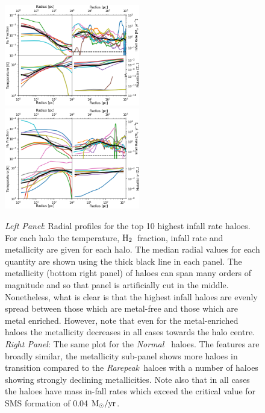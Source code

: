 \documentclass[graphics, twocolumn, usenatbib]{mn2e}
\newcommand{\msolaryrc} {$\rm{M_{\odot}/yr}$}
\newcommand{\molH} {$\rm{H_2}$~}
\newcommand{\rarepeak} {\textit{Rarepeak~}}
\newcommand{\normal} {\textit{Normal~}}
\begin{document}
\begin{figure}
\centering
\begin{minipage}{175mm}      \begin{center} 
\centerline{
\includegraphics[width=0.525\textwidth]{FIGURES/MultiPlot_Rarepeak.png}
\includegraphics[width=0.525\textwidth]{FIGURES/MultiPlot_Normal.png}}
\caption{\textit{Left Panel}: Radial profiles for the top 10 highest infall rate haloes. For
  each halo the temperature, \molH fraction, infall rate and metallicity are given for
  each halo. The median radial values for each quantity are shown using the
  thick black line in each panel. The metallicity (bottom right panel) of haloes can span many
  orders of magnitude and so that panel is artificially cut in the middle. Nonetheless, what is
  clear is that the highest infall haloes are evenly spread between those which are metal-free and
  those which are metal enriched. However, note that even for the metal-enriched haloes the
  metallicity decreases in all cases towards the halo centre. 
  \textit{Right Panel}: The same plot for the \normal
  haloes. The features are broadly similar, the metallicity sub-panel shows more haloes in transition
  compared to the \rarepeak haloes with a number of haloes showing strongly declining metallicities.
  Note also that in all cases the haloes have mass in-fall rates which exceed the critical value
  for SMS formation of 0.04 \msolaryrc.
} \label{Fig:RadialProfiles}
\end{center} \end{minipage}

\end{figure}
\end{document}
